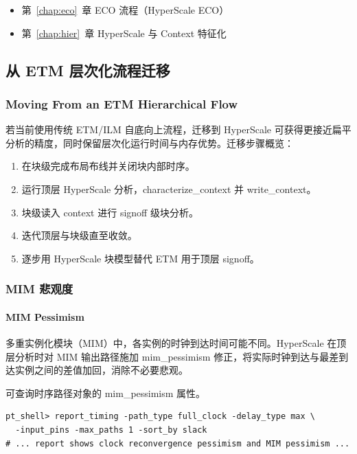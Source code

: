 \begin{seeAlsoBox}
\begin{itemize}
  \item 第~\ref{chap:eco}~章 ECO 流程（HyperScale ECO）
  \item 第~\ref{chap:hier}~章 HyperScale 与 Context 特征化
\end{itemize}
\end{seeAlsoBox}

\subsection{从 ETM 层次化流程迁移}
\subsubsection*{Moving From an ETM Hierarchical Flow}

若当前使用传统 ETM/ILM 自底向上流程，迁移到 HyperScale 可获得更接近扁平分析的精度，同时保留层次化运行时间与内存优势。迁移步骤概览：
\begin{enumerate}
  \item 在块级完成布局布线并关闭块内部时序。
  \item 运行顶层 HyperScale 分析，characterize_context 并 write_context。
  \item 块级读入 context 进行 signoff 级块分析。
  \item 迭代顶层与块级直至收敛。
  \item 逐步用 HyperScale 块模型替代 ETM 用于顶层 signoff。
\end{enumerate}

\subsubsection{MIM 悲观度}
\paragraph*{MIM Pessimism}

多重实例化模块（MIM）中，各实例的时钟到达时间可能不同。HyperScale 在顶层分析时对 MIM 输出路径施加 mim_pessimism 修正，将实际时钟到达与最差到达实例之间的差值加回，消除不必要悲观。

可查询时序路径对象的 mim_pessimism 属性。
\begin{lstlisting}
pt_shell> report_timing -path_type full_clock -delay_type max \
  -input_pins -max_paths 1 -sort_by slack
# ... report shows clock reconvergence pessimism and MIM pessimism ...
\end{lstlisting}

